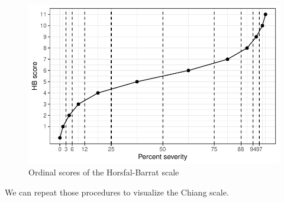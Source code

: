 \documentclass[
  letterpaper,
  DIV=11,
  numbers=noendperiod]{scrreprt}
\begin{document}
\begin{figure}[H]

{\centering \includegraphics{data-ordinal_files/figure-pdf/fig-hb-1.pdf}

}

\caption{\label{fig-hb}Ordinal scores of the Horsfal-Barrat scale}

\end{figure}

We can repeat those procedures to visualize the Chiang scale.
\end{document}
